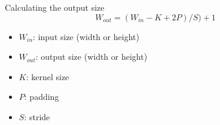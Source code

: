 \documentclass{beamer}
\begin{document}

		\begin{frame}{Calculating the output size}
		\[
		W_{out} = (W_{in}-K+2P)/S)+1
		\]
	\begin{itemize}
		\item $W_{in}$: input size (width or height)
		\item $W_{out}$: output size (width or height)
		 \item  $K$: kernel size
			\item $P$: padding
			\item $S$: stride
	\end{itemize}
		\end{frame}
	
\end{document}
